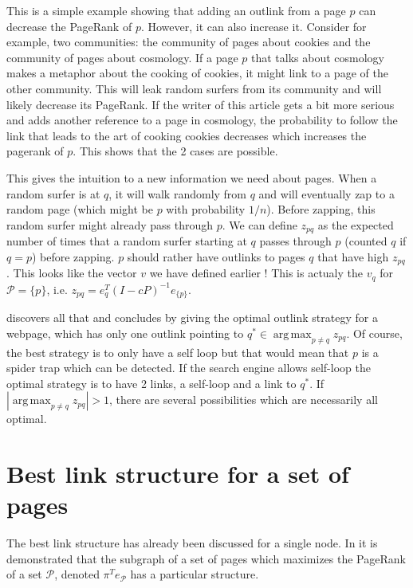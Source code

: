\documentclass{article}
\DeclareMathOperator*{\argmax}{arg\,max}
\newcommand{\1}{\mathbf{1}}
\theoremstyle{definition}
\begin{document}
This is a simple example showing that adding an outlink from a page \(p\) can decrease the PageRank of \(p\).
However, it can also increase it.
Consider for example, two communities: the community of pages about cookies and the community of pages about cosmology.
If a page \(p\) that talks about cosmology makes a metaphor about the cooking of cookies, it might link to a page of the other community.
This will leak random surfers from its community and will likely decrease its PageRank.
If the writer of this article gets a bit more serious and adds another reference to a page in cosmology, the probability to follow the link that leads to the art of cooking cookies decreases which increases the pagerank of \(p\).
This shows that the 2 cases are possible.

This gives the intuition to a new information we need about pages.
When a random surfer is at \(q\), it will walk randomly from \(q\) and will eventually zap to a random page (which might be \(p\) with probability \(1/n\)).
Before zapping, this random surfer might already pass through \(p\).
We can define \(z_{pq}\) as the expected number of times that a random surfer starting at \(q\) passes through \(p\) (counted \(q\) if \(q=p\)) before zapping.
\(p\) should rather have outlinks to pages \(q\) that have high \(z_{pq}\).
This looks like the vector \(v\) we have defined earlier !
This is actualy the \(v_q\) for \(\mathcal{P} = \{p\}\), i.e. \(z_{pq} = e_q^T(I-cP)^{-1}e_{\{p\}}\).

\cite{avrachenkov2006effect} discovers all that and concludes by giving the optimal outlink strategy for a webpage,
which has only one outlink pointing to \(q^* \in \argmax_{p \neq q} z_{pq}\).
Of course, the best strategy is to only have a self loop but that would mean that \(p\) is a spider trap which can be detected.
If the search engine allows self-loop the optimal strategy is to have 2 links, a self-loop and a link to \(q^*\).
If \(|\argmax_{p \neq q} z_{pq}| > 1\), there are several possibilities which are necessarily all optimal.



\section{Best link structure for a set of pages}
The best link structure has already been discussed for a single node.
In \cite{de2008maximizing} it is demonstrated that the subgraph of a set of pages which maximizes the PageRank of a set \(\mathcal{P}\), denoted \(\pi^T e_{\mathcal{P}}\) has a particular structure.
\end{document}

